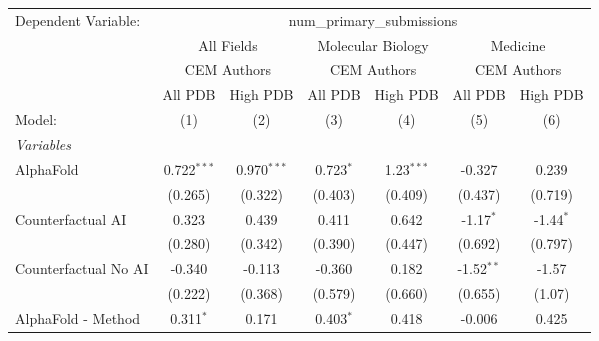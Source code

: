 \begingroup
\centering
\begin{tabular}{lcccccc}
   \tabularnewline \midrule \midrule
   Dependent Variable: & \multicolumn{6}{c}{num\_primary\_submissions}\\
 & \multicolumn{2}{c}{All Fields} & \multicolumn{2}{c}{Molecular Biology} & \multicolumn{2}{c}{Medicine} \\
\cmidrule(lr){2-3} \cmidrule(lr){4-5} \cmidrule(lr){6-7}
 & \multicolumn{2}{c}{CEM Authors} & \multicolumn{2}{c}{CEM Authors} & \multicolumn{2}{c}{CEM Authors} \\
\cmidrule(lr){2-3} \cmidrule(lr){4-5} \cmidrule(lr){6-7}
 & \multicolumn{1}{c}{All PDB} & \multicolumn{1}{c}{High PDB} & \multicolumn{1}{c}{All PDB} & \multicolumn{1}{c}{High PDB} & \multicolumn{1}{c}{All PDB} & \multicolumn{1}{c}{High PDB} \\
\cmidrule(lr){2-2} \cmidrule(lr){3-3} \cmidrule(lr){4-4} \cmidrule(lr){5-5} \cmidrule(lr){6-6} \cmidrule(lr){7-7}
   Model:                                                     & (1)           & (2)           & (3)          & (4)           & (5)          & (6)\\  
   \midrule
   \emph{Variables}\\
   AlphaFold                                                  & 0.722$^{***}$ & 0.970$^{***}$ & 0.723$^{*}$  & 1.23$^{***}$  & -0.327       & 0.239\\   
                                                              & (0.265)       & (0.322)       & (0.403)      & (0.409)       & (0.437)      & (0.719)\\   
   Counterfactual AI                                          & 0.323         & 0.439         & 0.411        & 0.642         & -1.17$^{*}$  & -1.44$^{*}$\\   
                                                              & (0.280)       & (0.342)       & (0.390)      & (0.447)       & (0.692)      & (0.797)\\   
   Counterfactual No AI                                       & -0.340        & -0.113        & -0.360       & 0.182         & -1.52$^{**}$ & -1.57\\   
                                                              & (0.222)       & (0.368)       & (0.579)      & (0.660)       & (0.655)      & (1.07)\\   
   AlphaFold - Method                                         & 0.311$^{*}$   & 0.171         & 0.403$^{*}$  & 0.418         & -0.006       & 0.425\\   

\end{tabular}
